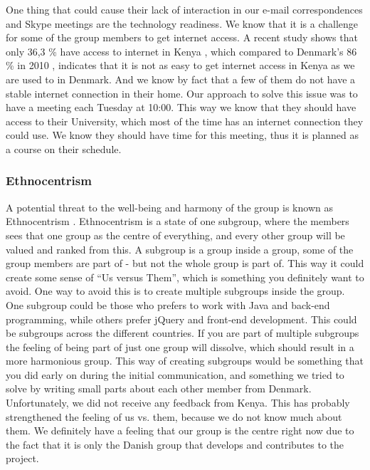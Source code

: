 One thing that could cause their lack of interaction in our e-mail correspondences and Skype meetings are the technology readiness. We know that it is a challenge for some of the group members to get internet access. A recent study shows that only 36,3 \% have access to internet in Kenya \cite{capitalfm2012internet}, which compared to Denmark's 86 \% in 2010 \cite{folketingets-eu-oplysning}, indicates that it is not as easy to get internet access in Kenya as we are used to in Denmark. And we know by fact that a few of them do not have a stable internet connection in their home. Our approach to solve this issue was to have a meeting each Tuesday at 10:00. This way we know that they should have access to their University, which most of the time has an internet connection they could use. We know they should have time for this meeting, thus it is planned as a course on their schedule.

\subsubsection{Ethnocentrism} \label{subsubsec:ethnocentrism}
A potential threat to the well-being and harmony of the group is known as Ethnocentrism \cite{durnell2004subgroup}. Ethnocentrism is a state of one subgroup, where the members sees that one group as the centre of everything, and every other group will be valued and ranked from this. A subgroup is a group inside a group, some of the group members are part of - but not the whole group is part of. This way it could create some sense of ``Us versus Them'', which is something you definitely want to avoid. One way to avoid this is to create multiple subgroups inside the group. One subgroup could be those who prefers to work with Java and back-end programming, while others prefer jQuery and front-end development. This could be subgroups across the different countries. If you are part of multiple subgroups the feeling of being part of just one group will dissolve, which should result in a more harmonious group.
This way of creating subgroups would be something that you did early on during the initial communication, and something we tried to solve by writing small parts about each other member from Denmark. Unfortunately, we did not receive any feedback from Kenya. This has probably strengthened the feeling of us vs. them, because we do not know much about them. We definitely have a feeling that our group is the centre right now due to the fact that it is only the Danish group that develops and contributes to the project.

